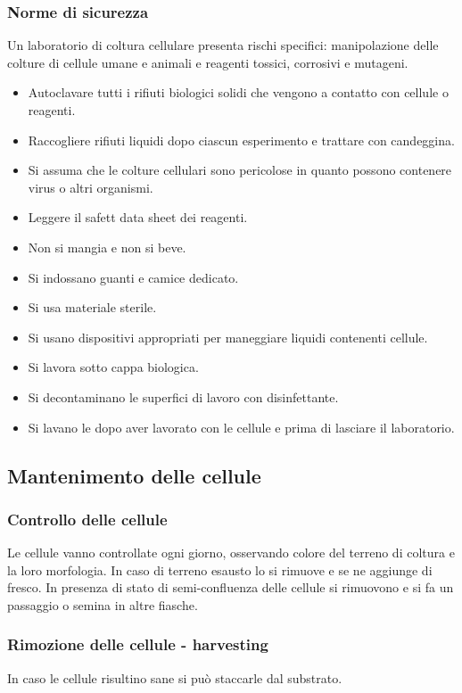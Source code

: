 		\subsubsection{Norme di sicurezza}
		Un laboratorio di coltura cellulare presenta rischi specifici: manipolazione delle colture di cellule umane e animali e reagenti tossici, corrosivi e mutageni.
		\begin{itemize}
			\item Autoclavare tutti i rifiuti biologici solidi che vengono a contatto con cellule o reagenti.
			\item Raccogliere rifiuti liquidi dopo ciascun esperimento e trattare con candeggina. 
			\item Si assuma che le colture cellulari sono pericolose in quanto possono contenere virus o altri organismi.
			\item Leggere il safett data sheet dei reagenti.
			\item Non si mangia e non si beve.
			\item Si indossano  guanti e camice dedicato.
			\item Si usa materiale sterile.
			\item Si usano dispositivi appropriati per maneggiare liquidi contenenti cellule.
			\item Si lavora sotto cappa biologica.
			\item Si decontaminano le superfici di lavoro con disinfettante.
			\item Si lavano le dopo aver lavorato con le cellule e prima di lasciare il laboratorio.
		\end{itemize}

	\subsection{Mantenimento delle cellule}

		\subsubsection{Controllo delle cellule}
		Le cellule vanno controllate ogni giorno, osservando colore del terreno di coltura e la loro morfologia.
		In caso di terreno esausto lo si rimuove e se ne aggiunge di fresco.
		In presenza di stato di semi-confluenza delle cellule si rimuovono e si fa un passaggio o semina in altre fiasche.
			
		\subsubsection{Rimozione delle cellule - harvesting}
		In caso le cellule risultino sane si pu\`o staccarle dal substrato. 
			
